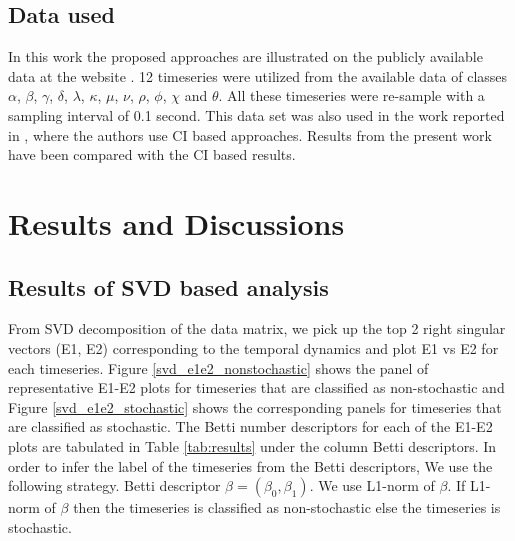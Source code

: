 \documentclass[10pt,conference]{IEEEtran}
\begin{document}
\subsection{Data used}
In this work the proposed approaches are illustrated on the publicly available data  at the website \cite{rxte}. 12 timeseries were utilized from the available data  of classes $\alpha$, $\beta$, $\gamma$, $\delta$, $\lambda$, $\kappa$, $\mu$, $\nu$, $\rho$, $\phi$, $\chi$ and $\theta$. All these timeseries were re-sample with a sampling interval of 0.1 second. This data set was also used in the work reported in \cite{Adegoke2018}, where the authors use CI based approaches. Results from the present work have been compared with the CI based results.

\section{Results and Discussions}

\subsection{Results of SVD based analysis}



From SVD decomposition of the data matrix, we pick up the top 2 right singular vectors (E1, E2) corresponding to the temporal dynamics and plot E1 vs E2 for each timeseries. Figure \ref{svd_e1e2_nonstochastic} shows the panel of representative E1-E2 plots for timeseries  that are classified as non-stochastic and Figure \ref{svd_e1e2_stochastic}  shows the corresponding panels for timeseries that are classified as stochastic. The Betti number descriptors for each of the E1-E2 plots are tabulated in Table \ref{tab:results} under the column Betti descriptors. In order to infer the label of the timeseries from the Betti descriptors, We use the following strategy. Betti descriptor $\beta = (\beta_0, \beta_1)$. We use L1-norm of $\beta$. If L1-norm of $\beta$ then the timeseries is classified as non-stochastic else the timeseries is stochastic.
\end{document}
